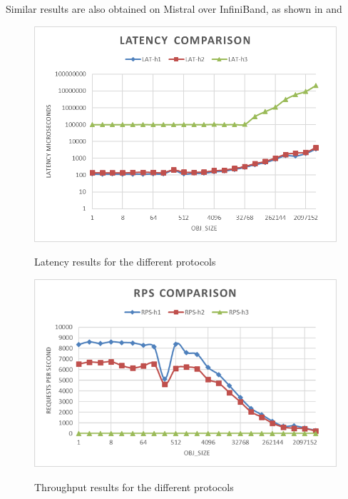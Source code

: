 \documentclass[runningheads]{llncs}
\begin{document}
Similar results are also obtained on Mistral over InfiniBand, as shown in  and 
\begin{figure}
    \centering
    \begin{minipage}{0.49\textwidth}
        \centering
        \includegraphics[width=1\textwidth]{lat-h2load-mistral.png}\vspace{-1em}
        \caption{Latency results for the different protocols}\vspace{-1.5em}
		\label {fig:lat-comp-mistral}
    \end{minipage}\hfill
    \begin{minipage}{0.49\textwidth}
        \centering
        \includegraphics[width=1\textwidth]{rps-h2load-mistral.png}\vspace{-1em}
        \caption{Throughput results for the different protocols}\vspace{-1.5em}
		\label {fig:rps-comp-mistral}
    \end{minipage}
\end{figure}
\end{document}
